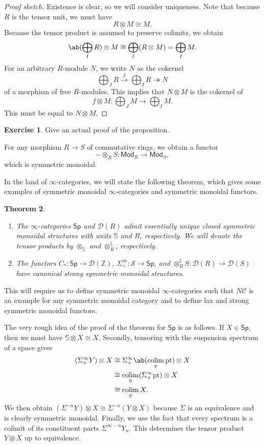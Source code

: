 \documentclass[10pt]{amsart}
\newtheorem{thm}{Theorem}[subsection]
\theoremstyle{definition}
\newtheorem{exer}[thm]{Exercise}
\theoremstyle{remark}
\theoremstyle{plain}
\theoremstyle{definition}
\theoremstyle{remark}
\newcommand{\Z}{\mathbb{Z}}
\newcommand{\bS}{\mathbb{S}}
\renewcommand{\L}{\mathbb{L}}
\newcommand{\mc}[1]{\mathcal{#1}}
\newcommand{\mr}[1]{\mathrm{#1}}
\newcommand{\ms}[1]{\mathsf{#1}}
\newcommand{\1}{\mathbf{1}}
\newcommand{\2}{\mathbf{2}}
\newcommand{\3}{\mathbf{3}}
\newcommand{\pt}{\mr{pt}}
\DeclareMathOperator*{\colim}{colim}
\begin{document}
\begin{proof}[Proof sketch]
    Existence is clear, so we will consider uniqueness. Note that because $R$ is the tensor unit, we must have
    \[ R \otimes M \cong M. \]
    Because the tensor product is assumed to preserve colimits, we obtain
    \[ \ab(\bigoplus_I R) \otimes M \cong \bigoplus_I (R \otimes M) = \bigoplus_I M. \]
    For an arbitrary $R$-module $N$, we write $N$ as the cokernel 
    \[ \bigoplus_J R \xrightarrow{f} \bigoplus_I R \twoheadrightarrow N \]
    of a morphism of free $R$-modules. This implies that $N \otimes M$ is the cokernel of
    \[ f \otimes M \colon \bigoplus_J M \to \bigoplus_I M. \]
    This must be equal to $N \otimes M$.
\end{proof}

\begin{exer}
    Give an actual proof of the proposition.
\end{exer}

For any morphism $R \to S$ of commutative rings, we obtain a functor
\[ - \otimes_R S \colon \ms{Mod}_R \to \ms{Mod}_S, \]
which is symmetric monoidal.

In the land of $\infty$-categories, we will state the following theorem, which gives some examples of symmetric monoidal $\infty$-categories and symmetric monoidal functors.
\begin{thm}\label{thm:symmetricmonoidal}\leavevmode
    \begin{enumerate}
        \item The $\infty$-categories $\ms{Sp}$ and $\mc{D}(R)$ admit essentially unique closed symmetric monoidal structures with units $\bS$ and $R$, respectively. We will denote the tensor products by $\otimes_{\bS}$ and $\otimes_R^{\L}$, respectively.
        \item The functors $C_* \colon \ms{Sp} \to \mc{D}(\Z)$, $\Sigma_+^{\infty} \colon \mc{S} \to \ms{Sp}$, and $\otimes_R^{\L} S \colon \mc{D}(R) \to \mc{D}(S)$ have canonical strong symmetric monoidal structures.
    \end{enumerate}
\end{thm}

This will require us to define symmetric monoidal $\infty$-categories such that $N\mc{C}$ is an example for any symmetric monoidal category and to define lax and strong symmetric monoidal functors.

The very rough idea of the proof of the theorem for $\ms{Sp}$ is as follows. If $X \in \ms{Sp}$, then we must have $\bS \otimes X \cong X$. Secondly, tensoring with the suspension spectrum of a space gives
\begin{align*}
    (\Sigma_+^{\infty} Y) \otimes X &\cong \Sigma_+^{\infty} \ab(\colim_y \pt) \otimes X \\
    &\cong \colim_y (\Sigma_+^{\infty} \pt) \otimes X \\
    &\cong \colim_y X.
\end{align*}
We then obtain $(\Sigma^{-n} Y) \otimes X \cong \Sigma^{-n} (Y \otimes X)$ because $\Sigma$ is an equivalence and is clearly symmetric monoidal. Finally, we use the fact that every spectrum is a colimit of its constituent parts $\Sigma^{\infty -n} Y_n$. This determines the tensor product $Y \otimes X$ up to equivalence.
\end{document}
